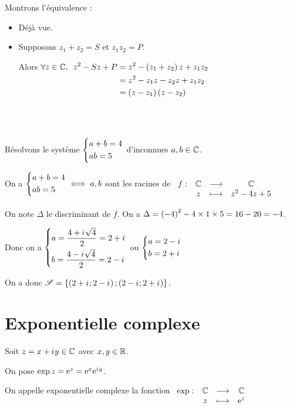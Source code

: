 \begin{dem}
Montrons l'équivalence :

\begin{itemize}
\item[\imprec] Déjà vue.

\item[\impdir] Supposons \(z_1+z_2=S\) et \(z_1z_2=P\).

Alors \(\begin{aligned}[t]
\quantifs{\forall z\in\C}z^2-Sz+P&=z^2-\paren{z_1+z_2}z+z_1z_2 \\
&=z^2-z_1z-z_2z+z_1z_2 \\
&=\paren{z-z_1}\paren{z-z_2}
\end{aligned}\)
\end{itemize}

~
\end{dem}

\begin{ex}~\\
Résolvons le système \(\begin{dcases}a+b=4 \\ ab=5\end{dcases}\) d'inconnues \(a,b\in\mathbb{C}\).

On a \(\begin{dcases}a+b=4 \\ ab=5\end{dcases}\iff a,b\) sont les racines de \(\begin{array}[t]{cccc}f : & \mathbb{C} & \longrightarrow & \mathbb{C} \\ & z & \longmapsto & z^2-4z+5\end{array}\)

On note \(\Delta\) le discriminant de \(f\). On a \(\Delta=\left(-4\right)^2-4\times1\times5=16-20=-4\).

Donc on a \(\begin{dcases}a=\dfrac{4+i\mkern1mu\sqrt{4}}{2}=2+i\mkern1mu \\ b=\dfrac{4-i\mkern1mu\sqrt{4}}{2}=2-i\mkern1mu\end{dcases}\) ou \(\begin{dcases}a=2-i\mkern1mu \\ b=2+i\mkern1mu\end{dcases}\)

On a donc \(\mathscr{S}=\left\lbrace\left(2+i\mkern1mu;2-i\mkern1mu\right);\left(2-i\mkern1mu;2+i\mkern1mu\right)\right\rbrace\).
\end{ex}

\section{Exponentielle complexe}

\begin{defi}
Soit \(z=x+i\mkern1mu y\in\mathbb{C}\) avec \(x,y\in\mathbb{R}\).

On pose \(\exp z=\mathrm{e}^{z}=\mathrm{e}^{x}\mathrm{e}^{i\mkern1mu y}\).

On appelle exponentielle complexe la fonction \(\begin{array}[t]{cccc}\exp : & \mathbb{C} & \longrightarrow & \mathbb{C} \\ & z & \longmapsto & \mathrm{e}^{z}\end{array}\)
\end{defi}

